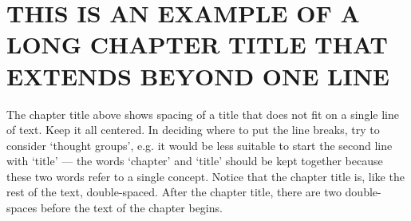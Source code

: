 \chapter{\MakeUppercase{THIS IS AN EXAMPLE OF A LONG CHAPTER TITLE THAT EXTENDS BEYOND ONE LINE}}

The chapter title above shows spacing of a title that does not fit on a single line of
text. Keep it all centered. In deciding where to put the line breaks, try to consider
`thought groups', e.g. it would be less suitable to start the second line with `title' —
the words `chapter' and `title' should be kept together because these two words
refer to a single concept.
Notice that the chapter title is, like the rest of the text, double-spaced. After the
chapter title, there are two double-spaces before the text of the chapter begins.



